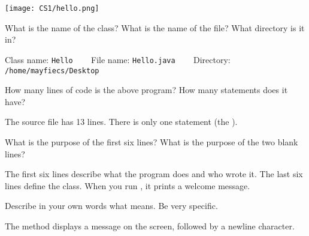 
\begin{center}
\texttt{[image: CS1/hello.png]}
\end{center}



\Q What is the name of the class?
What is the name of the file?
What directory is it in?

\begin{answer}
Class name: \texttt{Hello} ~~~
File name: \texttt{Hello.java} ~~~
Directory: \texttt{/home/mayfiecs/Desktop}
\end{answer}


\Q How many lines of code is the above program?
How many statements does it have?

\begin{answer}
The source file has 13 lines.
There is only one statement (the ).
\end{answer}


\Q What is the purpose of the first six lines?
What is the purpose of the two blank lines?

\begin{answer}
The first six lines describe what the program does and who wrote it.
The last six lines define the  class.
When you run , it prints a welcome message.
\end{answer}


\Q Describe in your own words what  means. Be very specific.

\begin{answer}
The  method displays a message on the screen, followed by a newline character.
\end{answer}
